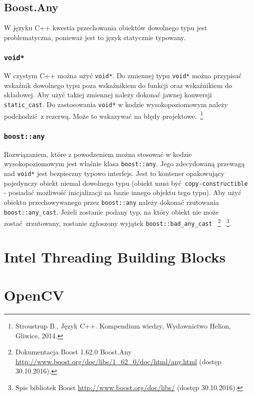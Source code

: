 \subsection{Boost.Any}
W języku C++ kwestia przechowania obiektów dowolnego typu jest problematyczna, ponieważ jest to język statycznie typowany. 

\subsubsection{\lstinline$void*$}
W czystym C++ można użyć \lstinline$void*$. Do zmiennej typu \lstinline$void*$ można przypisać wskaźnik dowolnego typu poza wskaźnikiem do funkcji oraz wskaźnikiem do składowej. Aby użyć takiej zmiennej należy dokonać jawnej konwersji \lstinline$static_cast$. Do zastosowania \lstinline$void*$ w kodzie wysokopoziomowym należy podchodzić z rezerwą. Może to wskazywać na błędy projektowe.~\footnote{Stroustrup B., Język C++. Kompendium wiedzy, Wydawnictwo Helion, Gliwice, 2014.}

\subsubsection{\lstinline$boost::any$}
Rozwiązaniem, które z powodzeniem można stosować w kodzie wysokopoziomowym jest właśnie klasa \lstinline$boost::any$. Jego zdecydowaną przewagą nad \lstinline$void*$ jest bezpieczny typowo interfejs. Jest to kontener opakowujący pojedynczy obiekt niemal dowolnego typu (obiekt musi być \lstinline$copy-constructible$ - posiadać możliwość inicjalizacji na bazie innego objektu tego typu).
Aby użyć obiektu przechowywanego przez \lstinline$boost::any$ należy dokonać rzutowania \lstinline$boost::any_cast$. Jeżeli zostanie podany typ, na który obiekt nie może zostać zrzutowany, zostanie zgłoszony wyjątek \lstinline$boost::bad_any_cast$
~\footnote{Dokumentacja Boost 1.62.0 Boost.Any \url{http://www.boost.org/doc/libs/1_62_0/doc/html/any.html} (dostęp 30.10.2016).}
~\footnote{Spis bibliotek Boost \url{http://www.boost.org/doc/libs/} (dostęp 30.10.2016).}.

 \section{Intel Threading Building Blocks}

 \section{OpenCV}

